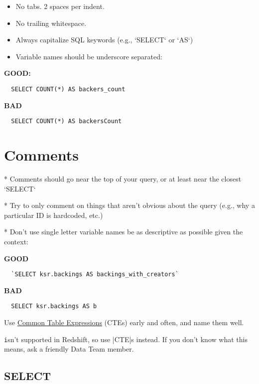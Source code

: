 \begin{itemize}
  \item No tabs. 2 spaces per indent.
  \item No trailing whitespace.
  \item Always capitalize SQL keywords (e.g., `SELECT` or `AS`)
  \item Variable names should be underscore separated:
\end{itemize}



\textbf{GOOD:}

\begin{verbatim}
  SELECT COUNT(*) AS backers_count
\end{verbatim}

\textbf{BAD}
  
\begin{verbatim} 
  SELECT COUNT(*) AS backersCount
\end{verbatim}  

\section{Comments}

* Comments should go near the top of your query, or at least near the closest `SELECT`

* Try to only comment on things that aren't obvious about the query (e.g., why a particular ID is hardcoded, etc.)

* Don't use single letter variable names be as descriptive as possible given the context:

\textbf{GOOD}

\begin{verbatim}
  `SELECT ksr.backings AS backings_with_creators`
\end{verbatim}

\textbf{BAD}
\begin{verbatim}
  SELECT ksr.backings AS b
\end{verbatim}


Use \href{http://www.postgresql.org/docs/8.4/static/queries-with.html}{Common Table Expressions} (CTEs) early and often, and name them well.

\texttt isn't supported in Redshift, so use |CTE|s instead. If you don't know what this means, ask a friendly Data Team member.

\subsection{SELECT}

